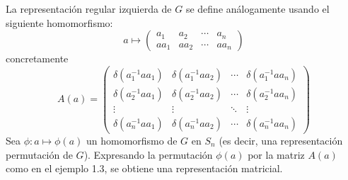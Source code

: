 \documentclass[12pt]{book}
\theoremstyle{definition}
\newcounter{in}
\begin{document}
La representación regular izquierda de $G$ se define análogamente
usando el siguiente homomorfismo:
\begin{equation*}
  a \mapsto
  \begin{pmatrix}
    a_{1} & a_{2} & \cdots  & a_{n}\\ 
    aa_{1} & aa_{2} & \cdots & aa_{n}
  \end{pmatrix}
\end{equation*}
concretamente
\begin{equation*}
  A\left(a\right) = 
  \begin{pmatrix}
    \delta\left(a_{1}^{-1}aa_{1}\right) & \delta\left(a_{1}^{-1}aa_{2}\right) & \cdots  & \delta\left(a_{1}^{-1}aa_{n}\right)\\
    \delta\left(a_{2}^{-1}aa_{1}\right) & \delta\left(a_{2}^{-1}aa_{2}\right) & \cdots  & \delta\left(a_{2}^{-1}aa_{n}\right)\\ 
    \vdots & \vdots & \ddots & \vdots\\
    \delta\left(a_{n}^{-1}aa_{1}\right) & \delta\left(a_{n}^{-1}aa_{2}\right) & \cdots  & \delta\left(a_{n}^{-1}aa_{n}\right)
  \end{pmatrix} 
\end{equation*}
Sea $\phi \colon a \mapsto \phi\left(a\right)$ un homomorfismo de $G$
en $S_{n}$ (es decir, una representación permutación de
$G$). Expresando la permutación $\phi\left(a\right)$ por la matriz
$A\left(a\right)$ como en el ejemplo 1.3, se obtiene una
representación matricial.
\end{document}
